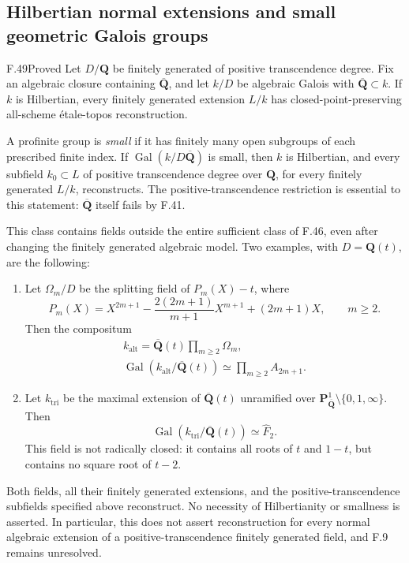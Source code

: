 \subsection{Hilbertian normal extensions and small geometric Galois groups}

\begin{claim}{F.49}{Proved}\label{clm:F49}
Let \(D/\mathbf Q\) be finitely generated of positive transcendence
degree. Fix an algebraic closure containing \(\overline{\mathbf Q}\),
and let \(k/D\) be algebraic Galois with
\(\overline{\mathbf Q}\subset k\).
If \(k\) is Hilbertian, every finitely generated extension \(L/k\)
has closed-point-preserving all-scheme étale-topos reconstruction.

A profinite group is \emph{small} if it has finitely many open
subgroups of each prescribed finite index. If
\(\operatorname{Gal}(k/D\overline{\mathbf Q})\) is small, then \(k\)
is Hilbertian, and every subfield \(k_0\subset L\) of positive
transcendence degree over \(\mathbf Q\), for every finitely generated
\(L/k\), reconstructs. The positive-transcendence restriction is
essential to this statement: \(\overline{\mathbf Q}\) itself fails
by F.41.

This class contains fields outside the entire sufficient class of
F.46, even after changing the finitely generated algebraic model.
Two examples, with \(D=\mathbf Q(t)\), are the following:
\begin{enumerate}
\item Let \(\Omega_m/D\) be the splitting field of \(P_m(X)-t\), where
\[
 P_m(X)=X^{2m+1}-\frac{2(2m+1)}{m+1}X^{m+1}+(2m+1)X,\qquad m\ge2.
 \tag{F.49.1}
\]
Then the compositum
\[
 \begin{gathered}
 k_{\mathrm{alt}}
   =\overline{\mathbf Q}(t)\prod_{m\ge2}\Omega_m,\\
 \operatorname{Gal}(k_{\mathrm{alt}}/\overline{\mathbf Q}(t))
       \simeq\prod_{m\ge2}A_{2m+1}.
 \end{gathered}
 \tag{F.49.2}
\]
\item Let \(k_{\mathrm{tri}}\) be the maximal extension of
\(\overline{\mathbf Q}(t)\) unramified over
\(\mathbf P^1_{\overline{\mathbf Q}}\setminus\{0,1,\infty\}\).
Then
\[
 \operatorname{Gal}(k_{\mathrm{tri}}/\overline{\mathbf Q}(t))
       \simeq\widehat F_2.
 \tag{F.49.3}
\]
This field is not radically closed: it contains all roots of \(t\)
and \(1-t\), but contains no square root of \(t-2\).
\end{enumerate}
Both fields, all their finitely generated extensions, and the
positive-transcendence subfields specified above reconstruct.
No necessity of Hilbertianity or smallness is asserted. In particular,
this does not assert reconstruction for every normal algebraic
extension of a positive-transcendence finitely generated field, and
F.9 remains unresolved.
\end{claim}
